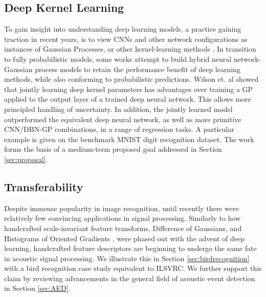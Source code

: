 \documentclass[12pt]{llncs}
\begin{document}
\subsection{Deep Kernel Learning}
To gain insight into understanding deep learning models, a practice gaining traction in recent years, is to view CNNs and other network configurations as instances of Gaussian Processes, or other kernel-learning methods \cite{duvenaud2014automatic}. In transition to fully probabilistic models, some works attempt to build hybrid neural network-Gaussian process models to retain the performance benefit of deep learning methods, while also conforming to probabilistic predictions. Wilson et. al \cite{wilson2016deep} showed that jointly learning deep kernel parameters has advantages over training a GP applied to the output layer of a trained deep neural network. This allows more principled handling of uncertainty. In addition, the jointly learned model outperformed the equivalent deep neural network, as well as more primitive CNN/DBN-GP combinations, in a range of regression tasks. A particular example is given on the benchmark MNIST digit recognition dataset. The work forms the basis of a medium-term proposed goal addressed in Section \ref{sec:proposal}.


\subsection{Transferability}
Despite immense popularity in image recognition, until recently there were relatively few convincing applications in signal processing. Similarly to how handcrafted scale-invariant feature transforms, Difference of Gaussians, and Histograms of Oriented Gradients \cite{lowe1999object,dalal2005histograms}, were phased out with the advent of deep learning, handcrafted feature descriptors are beginning to undergo the same fate in acoustic signal processing. We illustrate this in Section \ref{sec:birdrecognition} with a bird recognition case study equivalent to ILSVRC. We further support this claim by reviewing advancements in the general field of acoustic event detection in Section \ref{sec:AED}.
\end{document}
